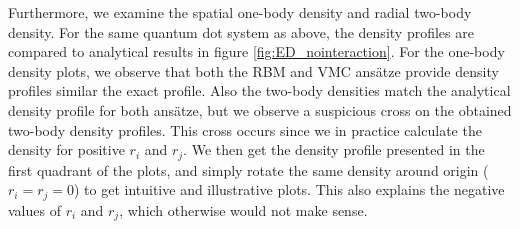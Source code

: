 Furthermore, we examine the spatial one-body density and radial two-body density. For the same quantum dot system as above, the density profiles are compared to analytical results in figure \eqref{fig:ED_nointeraction}. For the one-body density plots, we observe that both the RBM and VMC ansätze provide density profiles similar the exact profile. Also the two-body densities match the analytical density profile for both ansätze, but we observe a suspicious cross on the obtained two-body density profiles. This cross occurs since we in practice calculate the density for positive $r_i$ and $r_j$. We then get the density profile presented in the first quadrant of the plots, and simply rotate the same density around origin ($r_i=r_j=0$) to get intuitive and illustrative plots. This also explains the negative values of $r_i$ and $r_j$, which otherwise would not make sense. 

